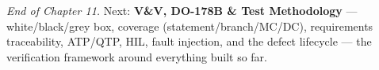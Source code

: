 \begin{partnote}
\emph{End of Chapter 11.} Next: \textbf{V\&V, DO-178B \& Test Methodology} ---
white/black/grey box, coverage (statement/branch/MC/DC), requirements
traceability, ATP/QTP, HIL, fault injection, and the defect lifecycle --- the
verification framework around everything built so far.
\end{partnote}
